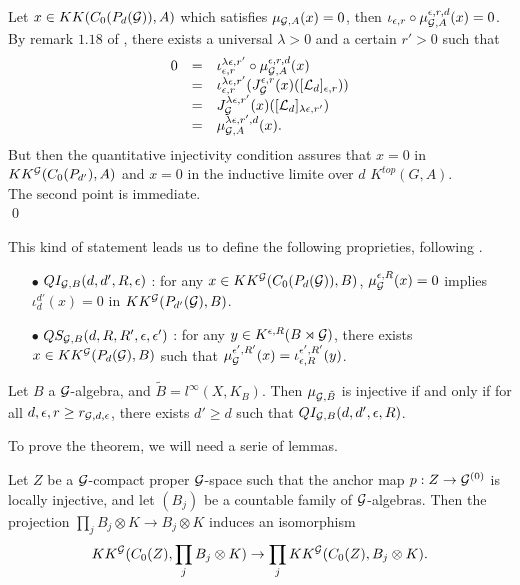 \begin{dem}
Let $x\in KK(C_0(P_d(\mathcal G)),A)$ which satisfies $\mu_{\mathcal G,A}(x)=0$, then $\iota_{\epsilon,r}\circ\mu_{\mathcal G,A}^{\epsilon,r,d}(x)=0$. By remark $1.18$ of \cite{OY2}, there exists a universal $\lambda>0$ and a certain $r'>0$ such that
\[\begin{array}{lll}0 &  =  & \iota_{\epsilon,r}^{\lambda\epsilon,r'}\circ \mu_{\mathcal G,A}^{\epsilon,r,d}(x) \\
			& = & \iota_{\epsilon,r}^{\lambda\epsilon,r'} (J_{\mathcal G}^{\epsilon,r}(x)([\mathcal L_d]_{\epsilon,r})) \\
			& = & J_{\mathcal G}^{\lambda\epsilon,r'}(x)([\mathcal L_d]_{\lambda\epsilon,r'}) \\
			& = & \mu_{\mathcal G,A}^{\lambda\epsilon,r',d}(x).
\end{array}\]
But then the quantitative injectivity condition assures that $x=0$ in $KK^\mathcal G(C_0(P_{d'}),A)$ and $x=0$ in the inductive limite over $d$ $K^{top}(G,A)$.\\
The second point is immediate. \\
\qed
\end{dem}

This kind of statement leads us to define the following proprieties, following \cite{OY3}.\\
\begin{itemize}
\item[$\bullet$] $QI_{\mathcal G,B}(d,d',R,\epsilon)$ : for any $x\in KK^\mathcal G(C_0(P_d(\mathcal G)), B )$, $\mu^{\epsilon,R}_\mathcal G(x) = 0$ implies $\iota_d^{d'}(x)=0$ in $KK^\mathcal G(P_{d'}(\mathcal G),B)$.
\item[$\bullet$] $QS_{\mathcal G,B}(d,R,R',\epsilon,\epsilon')$ : for any $y\in K^{\epsilon,R}(B\rtimes \mathcal G)$, there exists $x\in KK^\mathcal G(P_d(\mathcal G),B)$ such that $\mu^{\epsilon',R'}_\mathcal G(x)=\iota_{\epsilon,R}^{\epsilon',R'}(y)$.
\end{itemize} 

\begin{thm}\label{Quant1}
Let $B$ a $\mathcal G$-algebra, and $\tilde B = l^\infty(X,K_B)$. Then $\mu_{\mathcal G,\tilde B}$ is injective if and only if for all $d,\epsilon,r\geq r_{\mathcal G,d,\epsilon}$, there exists $d'\geq d$ such that $QI_{\mathcal G,B}(d,d',\epsilon,R)$. 
\end{thm}

To prove the theorem, we will need a serie of lemmas.\\

\begin{lem}
Let $Z$ be a $\mathcal G$-compact proper $\mathcal G$-space such that the anchor map $p:Z\rightarrow \mathcal G^{(0)}$ is locally injective, and let $(B_j)$ be a countable family of $\mathcal G$-algebras. Then the projection $\prod_j B_j \otimes K \rightarrow B_j\otimes K$ induces an isomorphism
\[KK^\mathcal G(C_0(Z),\prod_j B_j\otimes K)\rightarrow\prod_j KK^\mathcal G(C_0(Z),B_j\otimes K).\]
\label{LocalInjectivity}
\end{lem}

